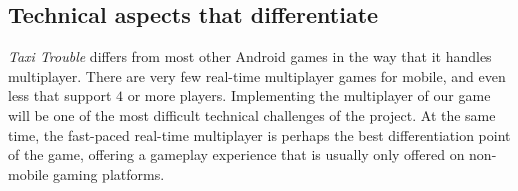 \subsection{Technical aspects that differentiate}
\emph{Taxi Trouble} differs from most other Android games in the way that it handles multiplayer. There are very few real-time multiplayer games for mobile, and even less that support $4$ or more players. Implementing the multiplayer of our game will be one of the most difficult technical challenges of the project. At the same time, the fast-paced real-time multiplayer is perhaps the best differentiation point of the game, offering a gameplay experience that is usually only offered on non-mobile gaming platforms.


